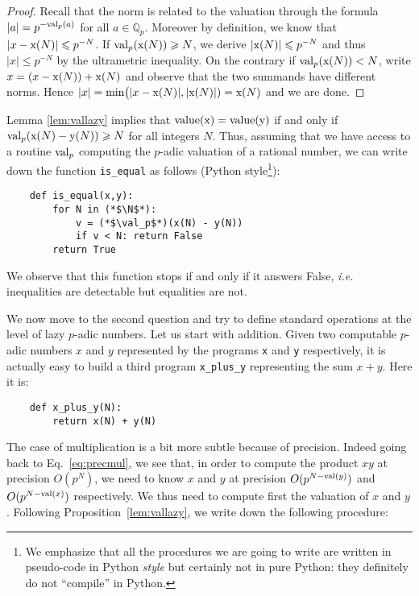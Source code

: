 \documentclass[11pt]{article}
\numberwithin{equation}{section}
\numberwithin{figure}{section}
\renewcommand{\leq}{\leqslant}
\renewcommand{\geq}{\geqslant}
\theoremstyle{definition}
\newcommand{\N}{\mathbb N}
\newcommand{\Q}{\mathbb Q}
\newcommand{\Qp}{\Q_p}
\renewcommand{\min}{\text{\rm min}}
\newcommand{\val}{\text{\rm val}}
\newcommand{\Value}{\text{\rm value}}
\newcommand{\ttx}{\texttt{\rm x}\xspace}
\newcommand{\tty}{\texttt{\rm y}\xspace}
\begin{document}
\begin{proof}
Recall that the norm is related to the valuation through the formula
$|a| = p^{-\val_p(a)}$ for all $a \in \Qp$. Moreover by definition,
we know that $|x - \ttx(N)| \leq p^{-N}$. If $\val_p
(\ttx(N)) \geq N$, we derive $|\ttx(N)| \leq p^{-N}$ and thus $|x|
\leq p^{-N}$ by the ultrametric inequality.
On the contrary if $\val_p (\ttx(N)) < N$, write $x = (x - \ttx(N))
+ \ttx(N)$ and observe that the two summands have different norms.
Hence $|x| = \min\big(|x - \ttx(N)|, |\ttx(N)|) = \ttx(N)$ and we
are done.
\end{proof}

\noindent
Lemma \ref{lem:vallazy} implies that $\Value(\ttx) = \Value(\tty)$ if and only if 
$\val_p(\ttx(N) - \tty(N)) \geq N$ for all integers $N$. Thus, assuming 
that we have access to a routine $\val_p$ computing the $p$-adic 
valuation of a rational number, we can write down the function 
\texttt{is\_equal} as follows (Python style\footnote{We emphasize that all the 
procedures we are going to write are written in pseudo-code in Python 
\emph{style} but certainly not in pure Python: they definitely do not
``compile'' in Python.}):

\begin{lstlisting}
    def is_equal(x,y):
        for N in (*$\N$*):
            v = (*$\val_p$*)(x(N) - y(N))
            if v < N: return False
        return True
\end{lstlisting}

\noindent
We observe that this function stops if and only if it answers False,
\emph{i.e.} inequalities are detectable but equalities are not.

\medskip

We now move to the second question and try to define standard operations 
at the level of lazy $p$-adic numbers. Let us start with addition. 
Given two computable $p$-adic numbers $x$ and $y$ represented by the 
programs \ttx and \tty respectively, it is actually easy to build a 
third program \texttt{x\_plus\_y} representing the sum $x+y$. Here it is:

\begin{lstlisting}
    def x_plus_y(N):
        return x(N) + y(N)
\end{lstlisting}

The case of multiplication is a bit more subtle because of precision.
Indeed going back to Eq.~\eqref{eq:precmul}, we see that, in order to
compute the product $xy$ at precision $O(p^N)$, we need to know $x$
and $y$ at precision $O(p^{N-\val(y)})$ and $O(p^{N-\val(x)})$
respectively. We thus need to compute first the valuation of $x$ and
$y$. Following Proposition~\ref{lem:vallazy}, we write down the
following procedure:
\end{document}
